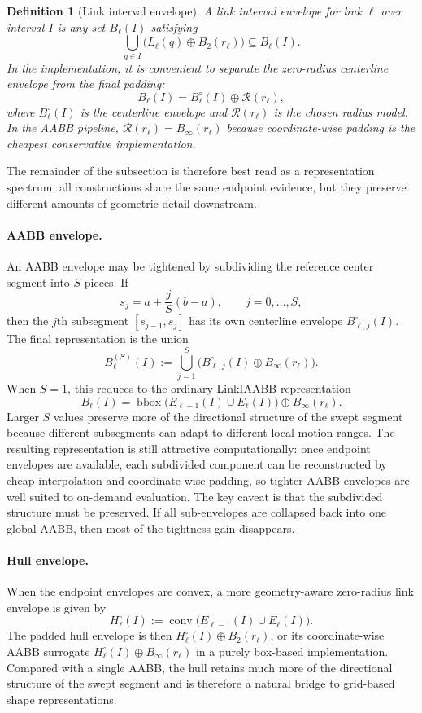 \documentclass[journal]{IEEEtran}
\newtheorem{definition}{Definition}
\begin{document}
\begin{definition}[Link interval envelope]\label{def:link_interval_env}
A link interval envelope for link $\ell$ over interval $I$ is any set
$B_\ell(I)$ satisfying
\[
\bigcup_{q\in I} \bigl(L_\ell(q) \oplus B_2(r_\ell)\bigr) \subseteq B_\ell(I).
\]
In the implementation, it is convenient to separate the zero-radius centerline
envelope from the final padding:
\[
B_\ell(I) = B_\ell^{\circ}(I) \oplus \mathcal{R}(r_\ell),
\]
where $B_\ell^{\circ}(I)$ is the centerline envelope and
$\mathcal{R}(r_\ell)$ is the chosen radius model. In the AABB pipeline,
$\mathcal{R}(r_\ell)=B_\infty(r_\ell)$ because coordinate-wise padding is the
cheapest conservative implementation.
\end{definition}

The remainder of the subsection is therefore best read as a representation
spectrum: all constructions share the same endpoint evidence, but they preserve
different amounts of geometric detail downstream.

\paragraph{AABB envelope.}
An AABB envelope may be tightened by subdividing the reference center segment
into $S$ pieces. If
\[
s_j = a + \frac{j}{S}(b-a), \qquad j=0,\dots,S,
\]
then the $j$th subsegment $[s_{j-1},s_j]$ has its own centerline envelope
$B^{\circ}_{\ell,j}(I)$. The final representation is the union
\[
B^{(S)}_\ell(I) := \bigcup_{j=1}^{S}
\bigl(B^{\circ}_{\ell,j}(I) \oplus B_\infty(r_\ell)\bigr).
\]
When $S=1$, this reduces to the ordinary LinkIAABB representation
\[
B_\ell(I) = \operatorname{bbox}\bigl(E_{\ell-1}(I) \cup E_\ell(I)\bigr)
\oplus B_\infty(r_\ell).
\]
Larger $S$ values preserve more of the directional structure of the swept
segment because different subsegments can adapt to different local motion
ranges. The resulting representation is still attractive computationally:
once endpoint envelopes are available, each subdivided component can be
reconstructed by cheap interpolation and coordinate-wise padding, so tighter
AABB envelopes are well suited to on-demand evaluation. The key caveat is that
the subdivided structure must be preserved. If all sub-envelopes are collapsed
back into one global AABB, then most of the tightness gain disappears.


\paragraph{Hull envelope.}
When the endpoint envelopes are convex, a more geometry-aware zero-radius link
envelope is given by
\[
H_\ell^{\circ}(I) := \operatorname{conv}\bigl(E_{\ell-1}(I) \cup E_\ell(I)\bigr).
\]
The padded hull envelope is then $H_\ell^{\circ}(I) \oplus B_2(r_\ell)$, or its
coordinate-wise AABB surrogate
$H_\ell^{\circ}(I) \oplus B_\infty(r_\ell)$ in a purely box-based
implementation. Compared with a single AABB, the hull retains much more of the
directional structure of the swept segment and is therefore a natural bridge to
grid-based shape representations.
\end{document}
